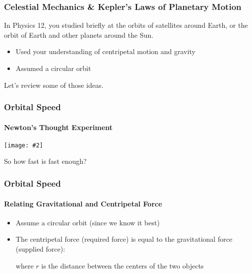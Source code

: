 \documentclass[12pt,compress,aspectratio=169]{beamer}
\newcommand{\pic}[2]{\texttt{[image: \#2]}}
\begin{document}
\begin{frame}
  \frametitle{Celestial Mechanics \& Kepler's Laws of Planetary Motion}
  In Physics 12, you studied briefly at the orbits of satellites around Earth,
  or the orbit of Earth and other planets around the Sun.
  \begin{itemize}
  \item Used your understanding of centripetal motion and gravity
  \item Assumed a circular orbit
  \end{itemize}
  Let's review some of those ideas.
\end{frame}


\begin{frame}
  \frametitle{Orbital Speed}
  \framesubtitle{Newton's Thought Experiment}
  \begin{center}
    \pic{1}{figure-5.jpg}
  \end{center}

  \vspace{-.3in}So how fast is fast enough?
\end{frame}


\begin{frame}
  \frametitle{Orbital Speed}
  \framesubtitle{Relating Gravitational and Centripetal Force}
  \begin{itemize}
  \item Assume a circular orbit (since we know it best)
  \item The centripetal force (required force) is equal to the gravitational
    force (supplied force):

    where $r$ is the distance between the centers of the two objects
  \end{itemize}
\end{frame}
\end{document}
